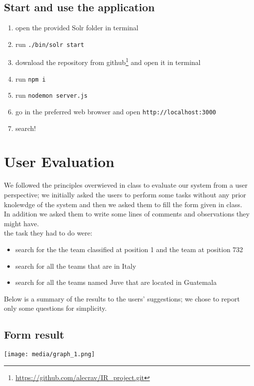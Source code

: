 \documentclass{article}
\begin{document}
\subsection{Start and use the application}
\begin{enumerate}
    \item open the provided Solr folder in terminal
    \item run \texttt{./bin/solr start}
    \item download the repository from github\footnote{\url{https://github.com/alecrav/IR_project.git}} and open it in terminal
    \item run \texttt{npm i}
    \item run \texttt{nodemon server.js}
    \item go in the preferred web browser and open \texttt{http://localhost:3000}
    \item search!
\end{enumerate}
\section{User Evaluation}
We followed the principles overwieved in class to evaluate our system from a user perspective; we initially asked the users to perform some tasks without any prior knolewdge of the system and then we asked them to fill the form given in class. In addition we asked them to write some lines of comments and observations they might have.\\
the task they had to do were:
\begin{itemize}
    \item search for the the team classified at position 1 and the team at position 732
    \item search for all the teams that are in Italy
    \item search for all the teams named Juve that are located in Guatemala
\end{itemize}
Below is a summary of the results to the users' suggestions; we chose to report only some questions for simplicity.\\
\subsection{Form result}
\begin{center}
  \texttt{[image: media/graph\_1.png]}\\
  \label{image:image-1}
\end{center}
\end{document}

